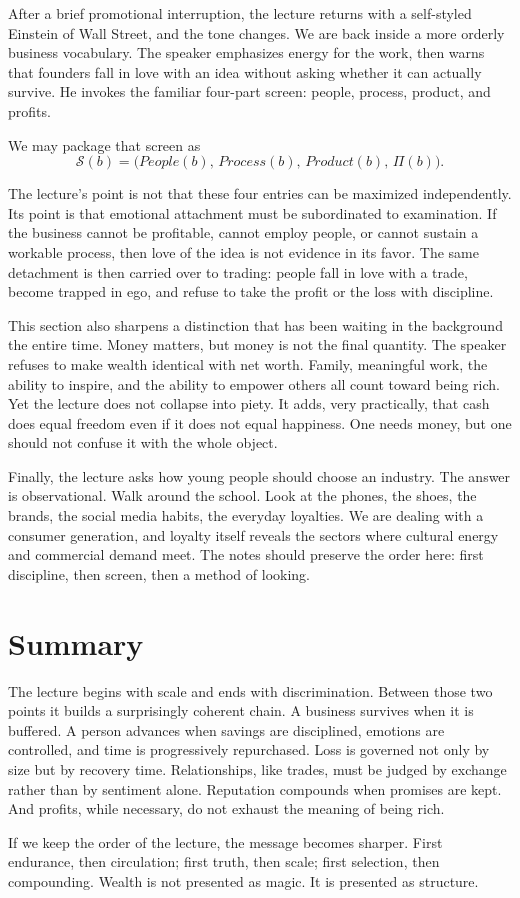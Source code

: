 After a brief promotional interruption, the lecture returns with a self-styled Einstein of Wall Street, and the tone changes. We are back inside a more orderly business vocabulary. The speaker emphasizes energy for the work, then warns that founders fall in love with an idea without asking whether it can actually survive. He invokes the familiar four-part screen: people, process, product, and profits.

We may package that screen as
\begin{equation}
\mathcal{S}(b)=\bigl(People(b),\,Process(b),\,Product(b),\,\Pi(b)\bigr).
\end{equation}

The lecture's point is not that these four entries can be maximized independently. Its point is that emotional attachment must be subordinated to examination. If the business cannot be profitable, cannot employ people, or cannot sustain a workable process, then love of the idea is not evidence in its favor. The same detachment is then carried over to trading: people fall in love with a trade, become trapped in ego, and refuse to take the profit or the loss with discipline.

This section also sharpens a distinction that has been waiting in the background the entire time. Money matters, but money is not the final quantity. The speaker refuses to make wealth identical with net worth. Family, meaningful work, the ability to inspire, and the ability to empower others all count toward being rich. Yet the lecture does not collapse into piety. It adds, very practically, that cash does equal freedom even if it does not equal happiness. One needs money, but one should not confuse it with the whole object.

Finally, the lecture asks how young people should choose an industry. The answer is observational. Walk around the school. Look at the phones, the shoes, the brands, the social media habits, the everyday loyalties. We are dealing with a consumer generation, and loyalty itself reveals the sectors where cultural energy and commercial demand meet. The notes should preserve the order here: first discipline, then screen, then a method of looking.

\section{Summary}

The lecture begins with scale and ends with discrimination. Between those two points it builds a surprisingly coherent chain. A business survives when it is buffered. A person advances when savings are disciplined, emotions are controlled, and time is progressively repurchased. Loss is governed not only by size but by recovery time. Relationships, like trades, must be judged by exchange rather than by sentiment alone. Reputation compounds when promises are kept. And profits, while necessary, do not exhaust the meaning of being rich.

If we keep the order of the lecture, the message becomes sharper. First endurance, then circulation; first truth, then scale; first selection, then compounding. Wealth is not presented as magic. It is presented as structure.